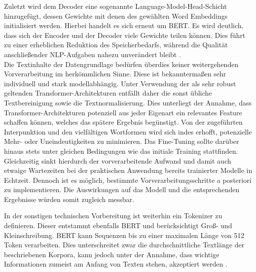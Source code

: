 \noindent
Zuletzt wird dem Decoder eine sogenannte Language-Model-Head-Schicht hinzugefügt, dessen Gewichte mit denen des gewählten Word Embeddings initialisiert werden. Hierbei handelt es sich erneut um \ac{BERT}. Es wird deutlich, dass sich der Encoder und der Decoder viele Gewichte teilen können. Dies führt zu einer erheblichen Reduktion des Speicherbedarfs, während die Qualität anschließender \ac{NLP}-Aufgaben nahezu unverändert bleibt \cite[S.~2]{ROT20}.\\

\noindent
Die Textinhalte der Datengrundlage bedürfen überdies keiner weitergehenden Vorverarbeitung im herkömmlichen Sinne. Diese ist bekanntermaßen sehr individuell und stark modellabhängig. Unter Verwendung der als sehr robust geltenden Transformer-Architekturen entfällt daher die sonst übliche Textbereinigung sowie die Textnormalisierung. Dies unterliegt der Annahme, dass Transformer-Architekturen potenziell aus jeder Eigenart ein relevantes Feature schaffen können, welches das spätere Ergebnis begünstigt. Von der zugeführten Interpunktion und den vielfältigen Wortformen wird sich indes erhofft, potenzielle Mehr- oder Uneindeutigkeiten zu minimieren. Das Fine-Tuning sollte darüber hinaus stets unter gleichen Bedingungen wie das initiale Training stattfinden. Gleichzeitig sinkt hierdurch der vorverarbeitende Aufwand und damit auch etwaige Wartezeiten bei der praktischen Anwendung bereits trainierter Modelle in Echtzeit. Dennoch ist es möglich, bestimmte Vorverarbeitungsschritte a posteriori zu implementieren. Die Auswirkungen auf das Modell und die entsprechenden Ergebnisse würden somit zugleich messbar.
\newpage

\noindent
In der sonstigen technischen Vorbereitung ist weiterhin ein Tokenizer zu definieren. Dieser entstammt ebenfalls \ac{BERT} und berücksichtigt Groß- und Kleinschreibung. \ac{BERT} kann Sequenzen bis zu einer maximalen Länge von 512 Token verarbeiten. Dies unterschreitet zwar die durchschnittliche Textlänge der beschriebenen Korpora, kann jedoch unter der Annahme, dass wichtige Informationen zumeist am Anfang von Texten stehen, akzeptiert werden \cite{VON20}.\\

